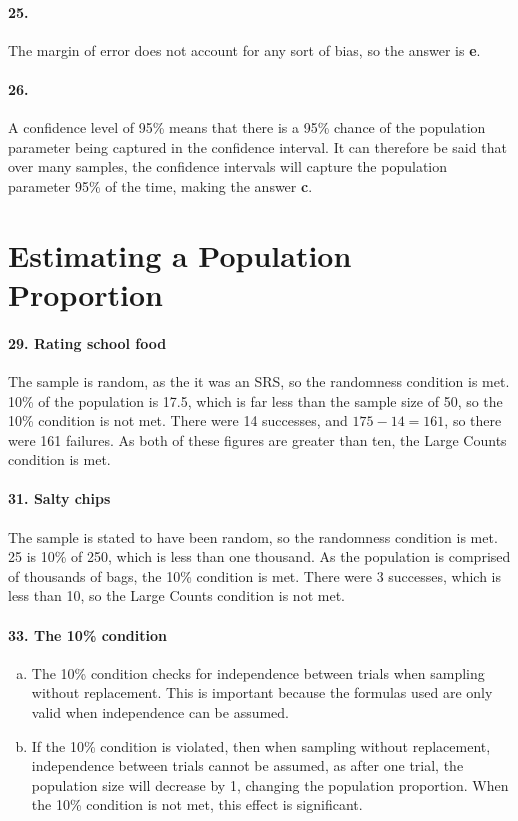 		\paragraph{25.} 
			The margin of error does not account for any sort of bias, so the answer is \textbf{e}.
		\paragraph{26.}
			A confidence level of 95\% means that there is a 95\% chance of the population parameter being captured in the confidence interval. It can therefore be said that over many samples, the confidence intervals will capture the population parameter 95\% of the time, making the answer \textbf{c}.
	\section{Estimating a Population Proportion}
		\paragraph{29. Rating school food} 
			The sample is random, as the it was an SRS, so the randomness condition is met. 			10\% of the population is 17.5, which is far less than the sample size of 50, so the 10\% condition is not met.
			There were 14 successes, and $175 - 14 = 161$, so there were 161 failures. As both of these figures are greater than ten, the Large Counts condition is met.
		\paragraph{31. Salty chips}
			The sample is stated to have been random, so the randomness condition is met.
			25 is 10\% of 250, which is less than one thousand. As the population is comprised of thousands of bags, the 10\% condition is met.
			There were 3 successes, which is less than 10, so the Large Counts condition is not met.
		\paragraph{33. The 10\% condition}
			\begin{enumerate}[a.]
				\item 
					The 10\% condition checks for independence between trials when sampling without replacement. This is important because the formulas used are only valid when independence can be assumed.
				\item
					If the 10\% condition is violated, then when sampling without replacement, independence between trials cannot be assumed, as after one trial, the population size will decrease by 1, changing the population proportion. When the 10\% condition is not met, this effect is significant.
			\end{enumerate}
